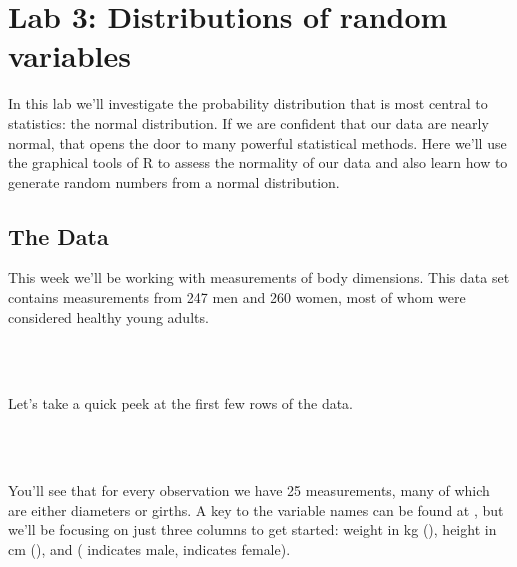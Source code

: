 \documentclass[11pt]{article}
\begin{document}
\section*{Lab 3: Distributions of random variables} %


In this lab we'll investigate the probability distribution that is most central to statistics: the normal distribution.  If we are confident that our data are nearly normal, that opens the door to many powerful statistical methods.  Here we'll use the graphical tools of R to assess the normality of our data and also learn how to generate random numbers from a normal distribution.

%

\subsection*{The Data}
This week we'll be working with measurements of body dimensions.  This data set contains measurements from 247 men and 260 women, most of whom were considered healthy young adults.

\ttfamily\noindent
{}\hlkeyword{(}\hlkeyword{,}{\ }\hlargument{=}{\ }\hlkeyword{)}\hspace*{\fill}\\
\hlstd{}\hlkeyword{(}\hlkeyword{)}\hspace*{\fill}\\
\normalfont

Let's take a quick peek at the first few rows of the data.

\ttfamily\noindent
\hlstd{}\hspace*{\fill}\\
\hlstd{}\hlkeyword{(}\hlkeyword{)}\hspace*{\fill}\\
\normalfont

You'll see that for every observation we have 25 measurements, many of which are either diameters or girths.  A key to the variable names can be found at , but we'll be focusing on just three columns to get started: weight in kg (\texttt{}), height in cm (\texttt{}), and \texttt{} (\texttt{} indicates male, \texttt{} indicates female).
\end{document}
